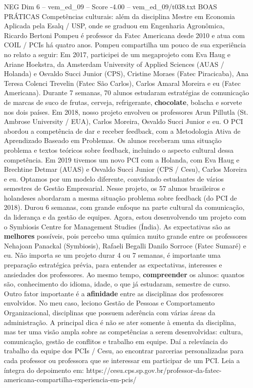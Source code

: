 \begin{textsample}{NEG Dim 6 – vem\_ed\_09 – Score -4.00 – vem\_ed\_09/t038.txt}  \label{ex:f6_neg_026}
BOAS PRÁTICAS Competências culturais: além da disciplina Mestre em Economia Aplicada pela Esalq / USP, onde se graduou em Engenharia Agronômica, Ricardo Bertoni Pompeu é professor da Fatec Americana desde 2010 e atua com COIL / PCIs há quatro anos.
Pompeu compartilha um pouco de sua experiência no relato a seguir: Em 2017, participei de um megaprojeto com Eva Haug e Ariane Hoekstra, da Amsterdam University of Applied Sciences (AUAS / Holanda) e Osvaldo Succi Junior (CPS), Cristine Moraes (Fatec Piracicaba), Ana Teresa Colenci Trevelin (Fatec São Carlos), Carlos Amaral Moreira e eu (Fatec Americana).
Durante 7 semanas, 70 alunos estudaram estratégias de comunicação de marcas de suco de frutas, cerveja, refrigerante, \textbf{chocolate}, bolacha e sorvete nos dois países.
Em 2018, nosso projeto envolveu os professores Arun Pillutla (St.
Ambrose University / EUA), Carlos Moreira, Osvaldo Succi Junior e eu.
O PCI abordou a competência de dar e receber feedback, com a Metodologia Ativa de Aprendizado Baseado em Problemas.
Os alunos receberam uma situação problema e textos teóricos sobre feedback, incluindo o aspecto cultural dessa competência.
Em 2019 tivemos um novo PCI com a Holanda, com Eva Haug e Brechtine Detmar (AUAS) e Osvaldo Succi Junior (CPS / Cesu), Carlos Moreira e eu.
Optamos por um modelo diferente, convidando estudantes de vários semestres de Gestão Empresarial.
Nesse projeto, os 57 alunos brasileiros e holandeses abordaram a mesma situação problema sobre feedback (do PCI de 2018).
Durou 6 semanas, com grande enfoque na parte cultural da comunicação, da liderança e da gestão de equipes.
Agora, estou desenvolvendo um projeto com o Symbiosis Centre for Management Studies (Índia).
As expectativas são as \textbf{melhores} possíveis, pois percebo uma química muito grande entre os professores Nehajoan Panackal (Symbiosis), Rafaeli Begalli Danilo Sorroce (Fatec Sumaré) e eu.
Não importa se um projeto durar 4 ou 7 semanas, é importante uma preparação estratégica prévia, para entender as expectativas, interesses e ansiedades dos professores.
Ao mesmo tempo, \textbf{compreender} os alunos: quantos são, conhecimento do idioma, idade, o que já estudaram, semestre de curso.
Outro fator importante é a \textbf{afinidade} entre as disciplinas dos professores envolvidos.
No meu caso, leciono Gestão de Pessoas e Comportamento Organizacional, disciplinas que possuem aderência com várias áreas da administração.
A principal dica é não se ater somente à ementa da disciplina, mas ter uma visão ampla sobre as competências a serem desenvolvidas: cultura, comunicação, gestão de conflitos e trabalho em equipe.
Daí a relevância do trabalho da equipe dos PCIs / Cesu, ao encontrar parcerias personalizadas para cada professor ou professora que se interessar em participar de um PCI.
Leia a íntegra do depoimento em: https://cesu.cps.sp.gov.br/professor-da-fatec-americana-compartilha-experiencia-em-pcis/

\end{textsample}
